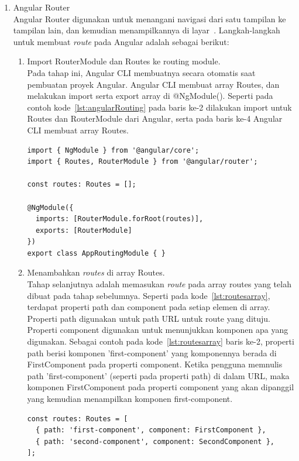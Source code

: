 \begin{enumerate}
	\item Angular Router \\
	Angular Router digunakan untuk menangani navigasi dari satu tampilan ke tampilan lain, dan kemudian menampilkannya di layar~\cite{victor:17:angular}. Langkah-langkah untuk membuat \textit{route} pada Angular adalah sebagai berikut:
	
	\begin{enumerate}
		\item Import RouterModule dan Routes ke routing module. \\
		Pada tahap ini, Angular CLI membuatnya secara otomatis saat pembuatan proyek Angular. Angular CLI membuat array Routes, dan melakukan import serta export array di @NgModule(). Seperti pada contoh kode~\ref{lst:angularRouting} pada baris ke-2 dilakukan import untuk Routes dan RouterModule dari Angular, serta pada baris ke-4 Angular CLI membuat array Routes.
		
		
\begin{lstlisting}[label={lst:angularRouting}, caption={Contoh \textit{Routing} pada Angular}]
import { NgModule } from '@angular/core';
import { Routes, RouterModule } from '@angular/router';

const routes: Routes = []; 

@NgModule({
  imports: [RouterModule.forRoot(routes)],
  exports: [RouterModule]
})
export class AppRoutingModule { }
\end{lstlisting}
		
		\item Menambahkan \textit{routes} di array Routes. \\
		Tahap selanjutnya adalah memasukan \textit{route} pada array routes yang telah dibuat pada tahap sebelumnya. Seperti pada kode~\ref{lst:routesarray}, terdapat properti path dan component pada setiap elemen di array. Properti path digunakan untuk path URL untuk route yang dituju. Properti component digunakan untuk menunjukkan komponen apa yang digunakan. Sebagai contoh pada kode~\ref{lst:routesarray} baris ke-2, properti path berisi komponen 'first-component' yang komponennya berada di FirstComponent pada properti component. Ketika pengguna memnulis path 'first-component' (seperti pada properti path) di dalam URL, maka komponen FirstComponent pada properti component yang akan dipanggil yang kemudian menampilkan komponen first-component.
		
\begin{lstlisting}[label={lst:routesarray}, caption={Contoh \textit{Routing} pada Angular}]
const routes: Routes = [
  { path: 'first-component', component: FirstComponent },
  { path: 'second-component', component: SecondComponent },
];
\end{lstlisting}
	

\end{enumerate}
\end{enumerate}
